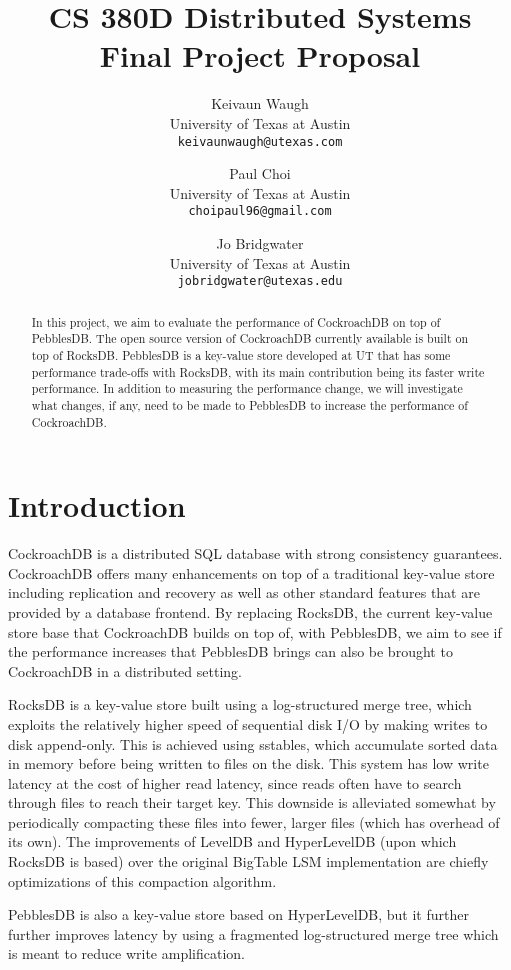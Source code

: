 \documentclass[10pt,twocolumn,letterpaper]{article}
\begin{document}
\title{CS 380D Distributed Systems Final Project Proposal}

\author{Keivaun Waugh\\
University of Texas at Austin\\
{\tt\small keivaunwaugh@utexas.com}
\and
Paul Choi\\
University of Texas at Austin\\
{\tt\small choipaul96@gmail.com}
\and
Jo Bridgwater\\
University of Texas at Austin\\
{\tt\small jobridgwater@utexas.edu}
}

\maketitle

\begin{abstract}
    In this project, we aim to evaluate the performance of CockroachDB on top of
    PebblesDB. The open source version of CockroachDB currently available is
    built on top of RocksDB. PebblesDB is a key-value store developed at UT
    that has some performance trade-offs with RocksDB, with its main
    contribution being its faster write performance. In addition to measuring
    the performance change, we will investigate what changes, if any, need to
    be made to PebblesDB to increase the performance of CockroachDB.
\end{abstract}

\section{Introduction}
CockroachDB is a distributed SQL database with strong consistency guarantees. CockroachDB offers many enhancements on top of a traditional key-value store including replication and recovery as well as other standard features that are provided by a database frontend. By replacing RocksDB, the current key-value store base that CockroachDB builds on top of, with PebblesDB, we aim to see if the performance increases that PebblesDB brings can also be brought to CockroachDB in a distributed setting.\par
RocksDB is a key-value store built using a log-structured merge tree, which exploits the relatively higher speed of sequential disk I/O by making writes to disk append-only. This is achieved using sstables, which accumulate sorted data in memory before being written to files on the disk. This system has low write latency at the cost of higher read latency, since reads often have to search through files to reach their target key. This downside is alleviated somewhat by periodically compacting these files into fewer, larger files (which has overhead of its own). The improvements of LevelDB and HyperLevelDB (upon which RocksDB is based) over the original BigTable LSM implementation are chiefly optimizations of this compaction algorithm.\par
PebblesDB is also a key-value store based on HyperLevelDB, but it further further improves latency by using a fragmented log-structured merge tree which is meant to reduce write amplification.
\end{document}
